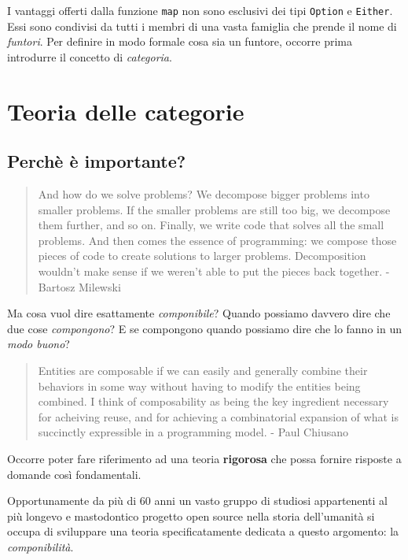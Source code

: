 \documentclass[12pt]{article}
\begin{document}
I vantaggi offerti dalla funzione \texttt{map} non sono esclusivi dei tipi \texttt{Option} e \texttt{Either}.
Essi sono condivisi da tutti i membri di una vasta famiglia che prende il nome di \emph{funtori}. Per definire in modo formale cosa sia un funtore,
occorre prima introdurre il concetto di \emph{categoria}.

\section{Teoria delle categorie}

\subsection{Perchè è importante?}

\begin{quote}
And how do we solve problems? We decompose bigger problems into smaller problems. If the smaller problems are still too big,
we decompose them further, and so on. Finally, we write code that solves all the small problems.
And then comes the essence of programming: we compose those pieces of code to create solutions to larger problems.
Decomposition wouldn’t make sense if we weren’t able to put the pieces back together. - Bartosz Milewski
\end{quote}

Ma cosa vuol dire esattamente \emph{componibile}? Quando possiamo davvero dire che due cose \emph{compongono}?
E se compongono quando possiamo dire che lo fanno in un \emph{modo buono}?\\

\begin{quote}
Entities are composable if we can easily and generally combine their behaviors in some way without having to modify the entities being combined.
I think of composability as being the key ingredient necessary for acheiving reuse, and for achieving a combinatorial expansion of
what is succinctly expressible in a programming model. - Paul Chiusano
\end{quote}

Occorre poter fare riferimento ad una teoria \textbf{rigorosa} che possa fornire risposte a domande così fondamentali.

Opportunamente da più di 60 anni un vasto gruppo di studiosi appartenenti al più longevo e mastodontico progetto open source nella storia
dell'umanità si occupa di sviluppare una teoria specificatamente dedicata a questo argomento: la \emph{componibilità}.
\end{document}
